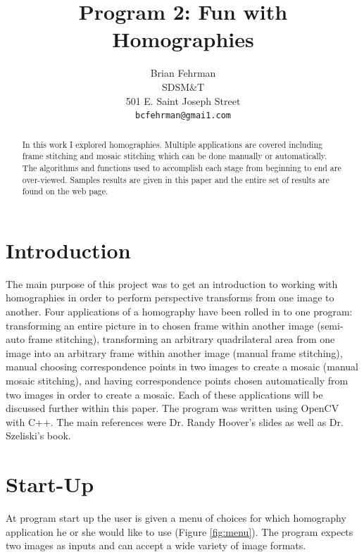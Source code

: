 \documentclass[10pt,twocolumn,letterpaper]{article}
\begin{document}
\title{ Program 2: Fun with Homographies}

\author{Brian Fehrman\\
SDSM\&T\\
501 E. Saint Joseph Street\\
{\tt\small bcfehrman@gmai1.com}
\thispagestyle{empty}
}

\maketitle
\begin{abstract}
In this work I explored homographies. Multiple applications are covered including frame stitching and mosaic stitching which can be done manually or automatically. The algorithms and functions used to accomplish each stage from beginning to end are over-viewed. Samples results are given in this paper and the entire set of results are found on the web page.

\end{abstract}



\section{Introduction}
The main purpose of this project was to get an introduction to working with homographies in order to perform perspective transforms from one image to another. Four applications of a homography have been rolled in to one program: transforming an entire picture in to chosen frame within another image (semi-auto frame stitching), transforming an arbitrary quadrilateral area from one image into an arbitrary frame within another image (manual frame stitching), manual choosing correspondence points in two images to create a mosaic (manual mosaic stitching), and having correspondence points chosen automatically from two images in order to create a mosaic. Each of these applications will be discussed further within this paper. The program was written using OpenCV with C++. The main references were Dr. Randy Hoover's slides as well as Dr. Szeliski's book.

\section{Start-Up}

At program start up the user is given a menu of choices for which homography application he or she would like to use (Figure \ref{fig:menu}). The program expects two images as inputs and can accept a wide variety of image formats.
\end{document}
